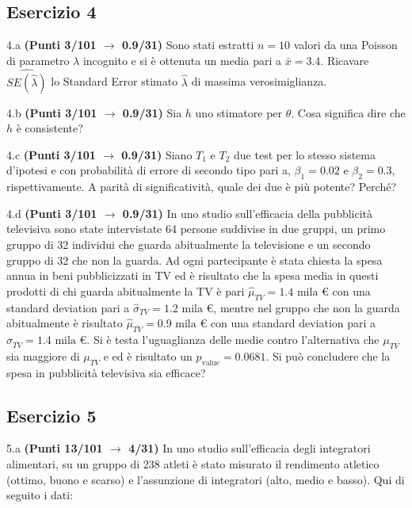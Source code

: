 \documentclass[
  11pt,
]{book}
\theoremstyle{mytheoremstyle}
\theoremstyle{mydefstyle}
\begin{document}
\subsection{Esercizio 4}\label{esercizio-4-25}

4.a \textbf{(Punti 3/101 \(\rightarrow\) 0.9/31)} Sono stati estratti \(n=10\) valori da una Poisson di parametro \(\lambda\) incognito e si è ottenuta un media pari a \(\bar x=3.4\). Ricavare \(\widehat{SE(\hat\lambda)}\) lo Standard Error stimato \(\hat\lambda\) di massima verosimiglianza.

4.b \textbf{(Punti 3/101 \(\rightarrow\) 0.9/31)} Sia \(h\) uno stimatore per \(\theta\). Cosa significa dire che \(h\) è consistente?

4.c \textbf{(Punti 3/101 \(\rightarrow\) 0.9/31)} Siano \(T_1\) e \(T_2\) due test per lo stesso sistema d'ipotesi e con probabilità di errore di secondo tipo pari a, \(\beta_1=0.02\) e \(\beta_2=0.3\), rispettivamente. A parità di significatività, quale dei due è più potente? Perché?

4.d \textbf{(Punti 3/101 \(\rightarrow\) 0.9/31)} In uno studio sull'efficacia della pubblicità televisiva sono state intervistate 64 persone suddivise in due gruppi, un primo gruppo di 32 individui che guarda abitualmente la televisione e un secondo gruppo di 32 che non la guarda. Ad ogni partecipante è stata chiesta la spesa annua in beni pubblicizzati in TV ed è risultato che la spesa media in questi prodotti di chi guarda abitualmente la TV è pari \(\hat\mu_{TV}=1.4\text{ mila €}\) con una standard deviation pari a \(\hat\sigma_{TV}=1.2\text{ mila €}\), mentre nel gruppo che non la guarda abitualmente è risultato \(\hat\mu_{\overline{TV}}=0.9\text{ mila €}\) con una standard deviation pari a \(\hat\sigma_{\overline{TV}}=1.4\text{ mila €}\). Si è testa l'uguaglianza delle medie contro l'alternativa che \(\mu_{TV}\) sia maggiore di \(\mu_{\overline{TV}}\) e ed è risultato un \(p_\text{value}= 0.0681\). Si può concludere che la spesa in pubblicità televisiva sia efficace?

\subsection{Esercizio 5}\label{esercizio-5-24}

5.a \textbf{(Punti 13/101 \(\rightarrow\) 4/31)} In uno studio sull'efficacia degli integratori alimentari, su un gruppo di 238 atleti è stato misurato il rendimento atletico (ottimo, buono e scarso) e l'assunzione di integratori (alto, medio e basso). Qui di seguito i dati:
\end{document}

